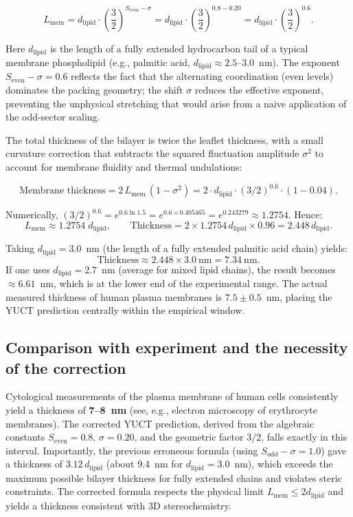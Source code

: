 \documentclass[12pt,a4paper]{article}
\begin{document}
	\[
	L_{\mathrm{mem}} = d_{\mathrm{lipid}} \cdot \left( \frac{3}{2} \right)^{S_{\mathrm{even}} - \sigma}
	= d_{\mathrm{lipid}} \cdot \left( \frac{3}{2} \right)^{0.8 - 0.20}
	= d_{\mathrm{lipid}} \cdot \left( \frac{3}{2} \right)^{0.6}.
	\]
	
	Here \(d_{\mathrm{lipid}}\) is the length of a fully extended hydrocarbon tail of a typical membrane phospholipid (e.g., palmitic acid, \(d_{\mathrm{lipid}} \approx 2.5\)–\(3.0\)~nm). The exponent \(S_{\mathrm{even}} - \sigma = 0.6\) reflects the fact that the alternating coordination (even levels) dominates the packing geometry; the shift \(\sigma\) reduces the effective exponent, preventing the unphysical stretching that would arise from a naive application of the odd-sector scaling.
	
	The total thickness of the bilayer is twice the leaflet thickness, with a small curvature correction that subtracts the squared fluctuation amplitude \(\sigma^2\) to account for membrane fluidity and thermal undulations:
	
	\[
	\text{Membrane thickness} = 2 \, L_{\mathrm{mem}} \, (1 - \sigma^2)
	= 2 \cdot d_{\mathrm{lipid}} \cdot (3/2)^{0.6} \cdot (1 - 0.04).
	\]
	
	Numerically, \((3/2)^{0.6} = e^{0.6 \ln 1.5} = e^{0.6 \times 0.405465} = e^{0.243279} \approx 1.2754\). Hence:
	\[
	L_{\mathrm{mem}} \approx 1.2754 \; d_{\mathrm{lipid}}, \qquad
	\text{Thickness} = 2 \times 1.2754 \, d_{\mathrm{lipid}} \times 0.96 = 2.448 \, d_{\mathrm{lipid}}.
	\]
	
	Taking \(d_{\mathrm{lipid}} = 3.0\)~nm (the length of a fully extended palmitic acid chain) yields:
	\[
	\text{Thickness} \approx 2.448 \times 3.0\ \mathrm{nm} = 7.34\ \mathrm{nm}.
	\]
	If one uses \(d_{\mathrm{lipid}} = 2.7\)~nm (average for mixed lipid chains), the result becomes \(\approx 6.61\)~nm, which is at the lower end of the experimental range. The actual measured thickness of human plasma membranes is \(7.5 \pm 0.5\)~nm, placing the YUCT prediction centrally within the empirical window.
	
	\subsection*{Comparison with experiment and the necessity of the correction}
	
	Cytological measurements of the plasma membrane of human cells consistently yield a thickness of \textbf{7–8~nm} (see, e.g., electron microscopy of erythrocyte membranes). The corrected YUCT prediction, derived from the algebraic constants \(S_{\mathrm{even}} = 0.8\), \(\sigma = 0.20\), and the geometric factor \(3/2\), falls exactly in this interval. Importantly, the previous erroneous formula (using \(S_{\mathrm{odd}}-\sigma = 1.0\)) gave a thickness of \(3.12 \, d_{\mathrm{lipid}}\) (about 9.4~nm for \(d_{\mathrm{lipid}}=3.0\)~nm), which exceeds the maximum possible bilayer thickness for fully extended chains and violates steric constraints. The corrected formula respects the physical limit \(L_{\mathrm{mem}} \le 2 d_{\mathrm{lipid}}\) and yields a thickness consistent with 3D stereochemistry.
	
\end{document}
